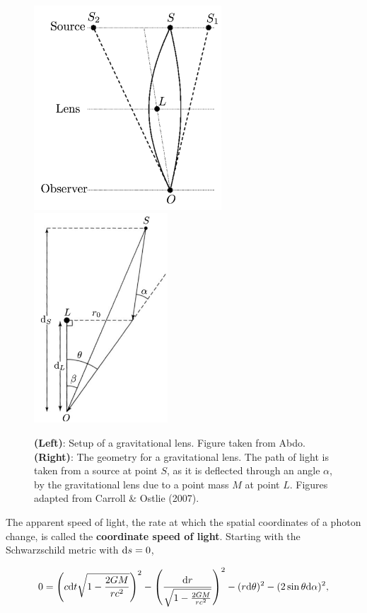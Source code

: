 \documentclass[a4paper,10pt]{article}
\begin{document}
\begin{figure}[t]
    \centering
    \includegraphics[width=7cm]{figures/GravitationalLens.png}
    \includegraphics[width=5cm]{figures/GravitationalLensAngles.png}
    \caption{\footnotesize{\textbf{(Left)}: Setup of a gravitational lens. Figure taken from Abdo. \textbf{(Right)}: The geometry for a gravitational lens. The path of light is taken from a source at point $S$, as it is deflected through an angle $\alpha$, by the gravitational lens due to a point mass $M$ at point $L$. Figures adapted from Carroll \& Ostlie (2007).}}
    \label{fig:gravitationallens}
\end{figure}

{\noindent}The apparent speed of light, the rate at which the spatial coordinates of a photon change, is called the \textbf{coordinate speed of light}. Starting with the Schwarzschild metric with ${\rm d}s=0$,

\begin{align*}
    0 = \left(c{\rm d}t \sqrt{1-\frac{2GM}{rc^2}}\right)^2 - \left(\frac{{\rm d}r}{\sqrt{1-\frac{2GM}{rc^2}}}\right)^2 - (r{\rm d}\theta)^2 - (2\sin\theta{\rm d}\alpha)^2,
\end{align*}
\end{document}
